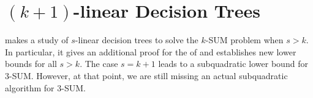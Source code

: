 \section{$(k+1)$-linear Decision Trees}

\cite{ailon:2005} makes a study of $s$-linear decision trees to solve the $k$-SUM
problem when $s > k$. In particular, it gives an additional proof for the
 of \cite{erickson:1999} and establishes new
lower bounds for all $s > k$. The case $s = k+1$ leads to a subquadratic
lower bound for $3$-SUM. However, at that point, we are still missing an actual
subquadratic algorithm for $3$-SUM.
